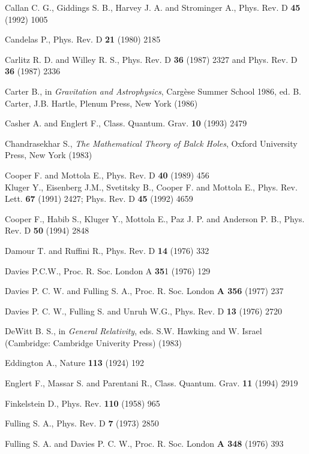 \documentclass[12pt,oneside]{report}
\begin{document}
{\begin{thebibliography}{999}
 Callan C. G., Giddings S. B., Harvey J. A. and Strominger A.,
Phys. Rev. D {\bf 45} (1992) 1005


 Candelas P., Phys. Rev. D {\bf 21} (1980) 2185

 Carlitz R. D. and Willey R. S., Phys. Rev. D {\bf 36}
(1987) 2327 and Phys. Rev. D {\bf 36}
(1987) 2336

Carter B., in {\em Gravitation and Astrophysics}, 
Carg\`ese Summer School
1986, ed. B. Carter, J.B. Hartle, Plenum Press, New York (1986)

 Casher A. and Englert F., Class. Quantum. Grav. {\bf 10} (1993) 2479


Chandrasekhar S., {\em The Mathematical Theory of Balck Holes},
Oxford University Press, New York (1983)

Cooper F. and Mottola E., Phys. Rev. D {\bf 40} (1989) 456
\\
Kluger Y., Eisenberg J.M., Svetitsky B., Cooper F. and Mottola E., 
Phys.
Rev. Lett. {\bf 67} (1991) 2427;  Phys. Rev. D {\bf 45} (1992) 4659

Cooper F., Habib S., Kluger Y., Mottola E., 
Paz J. P. and Anderson P. B., Phys. Rev. D {\bf 50} (1994) 2848


Damour T. and Ruffini R., Phys. Rev. D {\bf 14} (1976) 332

Davies P.C.W., Proc. R. Soc. London A {\bf 35}1 (1976) 129

 Davies P. C. W. and Fulling S. A., Proc. R. Soc. 
London {\bf A 356} (1977) 237


Davies P. C. W., Fulling S. and  Unruh W.G., Phys. Rev. D {\bf 13} (1976)
2720

DeWitt B. S., in {\em General Relativity}, eds. S.W. Hawking
and
W. Israel (Cambridge: Cambridge Univerity Press) (1983)

Eddington A., Nature {\bf 113} (1924) 192

 Englert F., Massar S. and Parentani R.,
 Class. Quantum. Grav. {\bf 11} (1994) 2919

Finkelstein D., Phys. Rev. {\bf 110} (1958) 965

Fulling S. A., Phys. Rev. D {\bf  7} (1973) 2850 

Fulling S. A. and Davies P. C. W., Proc. R. Soc. 
London {\bf A 348} (1976) 393


\end{thebibliography}}
\end{document}
